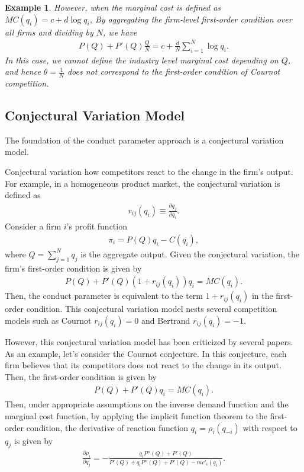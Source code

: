 \documentclass[11pt, a4paper]{article}
\newtheorem{example}{Example}
\theoremstyle{remark}
\begin{document}
\begin{example}
However, when the marginal cost is defined as $MC(q_i) = c + d\log q_i$, 
By aggregating the firm-level first-order condition over all firms and dividing by $N$, we have
\begin{align}
    P(Q) + P'(Q)\frac{Q}{N} = c + \frac{d}{N}\sum_{i=1}^N \log q_i.
\end{align}
In this case, we cannot define the industry level marginal cost depending on $Q$, and hence $\theta = \frac{1}{N}$ does not correspond to the first-order condition of Cournot competition.
\end{example}







\subsection{Conjectural Variation Model}



The foundation of the conduct parameter approach is a conjectural variation model.

Conjectural variation how competitors react to the change in the firm's output.
For example, in a homogeneous product market, the conjectural variation is defined as
\begin{align}
    r_{ij}(q_i) \equiv \frac{\partial q_j}{\partial q_i}.
\end{align}
Consider a firm $i$'s profit function
\begin{align}
    \pi_i = P(Q)q_i - C(q_i),
\end{align}
where $Q = \sum_{j=1}^N q_j$ is the aggregate output.
Given the conjectural variation, the firm's first-order condition is given by
\begin{align}
    P(Q) + P'(Q)(1+r_{ij}(q_i))q_i = MC(q_i).
\end{align}
Then, the conduct parameter is equivalent to the term $1+r_{ij}(q_i)$ in the first-order condition.
This conjectural variation model nests several competition models such as Cournot $r_{ij}(q_i) = 0$ and Bertrand $r_{ij}(q_i) = -1$.

However, this conjectural variation model has been criticized by several papers.
As an example, let's consider the Cournot conjecture.
In this conjecture, each firm believes that its competitors does not react to the change in its output.
Then, the first-order condition is given by
\begin{align}
    P(Q) + P'(Q)q_i = MC(q_i).
\end{align}
Then, under appropriate assumptions on the inverse demand function and the marginal cost function, by applying the implicit function theorem to the first-order condition, the derivative of reaction function $q_i = \rho_i(q_{-i})$ with respect to $q_j$ is given by
\begin{align}
    \frac{\partial \rho_i}{\partial q_j} = -\frac{q_iP''(Q) + P'(Q)}{P'(Q) + q_iP''(Q)+ P'(Q) - mc'_i(q_i)}.
\end{align}
\end{document}
